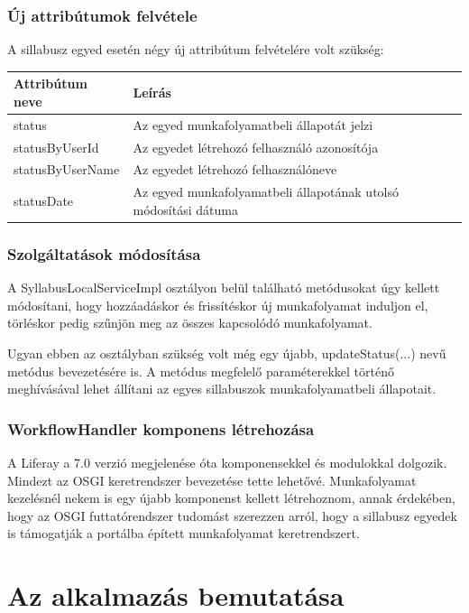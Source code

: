 \documentclass[hidelinks, 12pt, a4paper]{report}
\begin{document}
\subsection{Új attribútumok felvétele}

A sillabusz egyed esetén négy új attribútum felvételére volt szükség:
\begin{table}[H]
	\centering
	\begin{tabular}{| l | l | l |}
	\hline
	\textbf{Attribútum neve} & \textbf{Leírás} \\
	\hline
	status & Az egyed munkafolyamatbeli állapotát jelzi \\
	\hline
	statusByUserId & Az egyedet létrehozó felhasználó azonosítója \\
	\hline
	statusByUserName & Az egyedet létrehozó felhasználóneve \\
	\hline
	statusDate & Az egyed munkafolyamatbeli állapotának utolsó módosítási dátuma \\
	\hline
\end{tabular}
\end{table}

\subsection{Szolgáltatások módosítása}

A SyllabusLocalServiceImpl osztályon belül található metódusokat úgy kellett módosítani, hogy hozzáadáskor és frissítéskor új munkafolyamat induljon el, törléskor pedig szűnjön meg az összes kapcsolódó munkafolyamat.

Ugyan ebben az osztályban szükség volt még egy újabb, updateStatus(...) nevű metódus bevezetésére is. A metódus megfelelő paraméterekkel történő meghívásával lehet állítani az egyes sillabuszok munkafolyamatbeli állapotait.

\subsection{WorkflowHandler komponens létrehozása}

A Liferay a 7.0 verzió megjelenése óta komponensekkel és modulokkal dolgozik. Mindezt az OSGI keretrendszer bevezetése tette lehetővé. Munkafolyamat kezelésnél nekem is egy újabb komponenst kellett létrehoznom, annak érdekében, hogy az OSGI futtatórendszer tudomást szerezzen arról, hogy a sillabusz egyedek is támogatják a portálba épített munkafolyamat keretrendszert.

\chapter{Az alkalmazás bemutatása}
\end{document}
